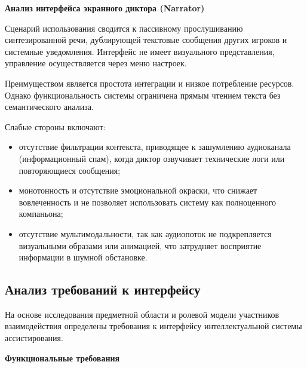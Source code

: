 \textbf{Анализ интерфейса экранного диктора (Narrator)}

Сценарий использования сводится к пассивному прослушиванию синтезированной речи, дублирующей текстовые сообщения других игроков и системные уведомления. Интерфейс не имеет визуального представления, управление осуществляется через меню настроек.

Преимуществом является простота интеграции и низкое потребление ресурсов. Однако функциональность системы ограничена прямым чтением текста без семантического анализа.

Слабые стороны включают:
\begin{itemize}
    \item отсутствие фильтрации контекста, приводящее к зашумлению аудиоканала (информационный спам), когда диктор озвучивает технические логи или повторяющиеся сообщения;
    \item монотонность и отсутствие эмоциональной окраски, что снижает вовлеченность и не позволяет использовать систему как полноценного компаньона;
    \item отсутствие мультимодальности, так как аудиопоток не подкрепляется визуальными образами или анимацией, что затрудняет восприятие информации в шумной обстановке.
\end{itemize}




\subsection{Анализ требований к интерфейсу}

На основе исследования предметной области и ролевой модели участников взаимодействия определены требования к интерфейсу интеллектуальной системы ассистирования.

\textbf{Функциональные требования}

